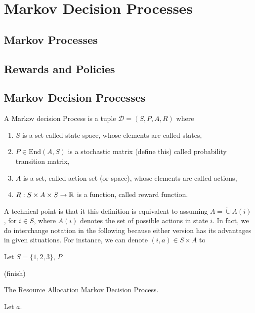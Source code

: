 \chapter{Markov Decision Processes}


\section{Markov Processes}

\section{Rewards and Policies}

\section{Markov Decision Processes}

A Markov decision Process is a tuple $\mathcal{D} = (S, P, A, R)$ where

\begin{enumerate}
	\item $S$ is a set called state space, whose elements are called states,
	\item $P \in \text{End}(A, S)$ is a stochastic matrix (define this) called probability transition matrix,
	\item $A$ is a set, called action set (or space), whose elements are called actions,
	\item $R: S \times A \times S \rightarrow \mathbb{R}$ is a function, called reward function.
	
\end{enumerate}

A technical point is that it this definition is equivalent to assuming $A = \dot\cup A(i)$, for $i \in S$, where $A(i)$ denotes the set of possible actions in state $i$. In fact, we do interchange notation in the following because either version has its advantages in given situations. For instance, we can denote $(i, a) \in S \times A$ to 



\begin{exmp}
	Let $S = \{1, 2, 3 \}$, $P$
\end{exmp}
(finish)

\begin{problem}
	The Resource Allocation Markov Decision Process.
	
	Let $a $.
\end{problem}

% 
%
%
%
%
%
%
%
%
%












